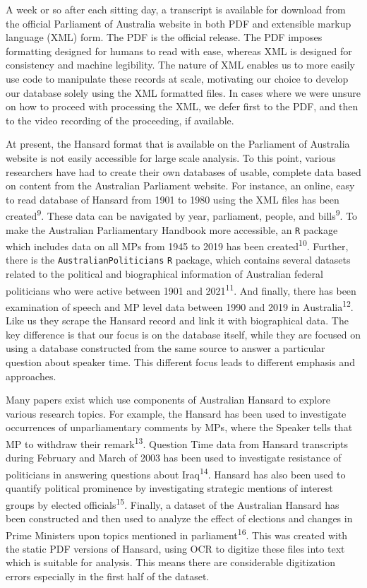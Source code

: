 \documentclass[
  letterpaper,
  DIV=11,
  numbers=noendperiod]{scrartcl}
\begin{document}
A week or so after each sitting day, a transcript is available for
download from the official Parliament of Australia website in both PDF
and extensible markup language (XML) form. The PDF is the official
release. The PDF imposes formatting designed for humans to read with
ease, whereas XML is designed for consistency and machine legibility.
The nature of XML enables us to more easily use code to manipulate these
records at scale, motivating our choice to develop our database solely
using the XML formatted files. In cases where we were unsure on how to
proceed with processing the XML, we defer first to the PDF, and then to
the video recording of the proceeding, if available.

At present, the Hansard format that is available on the Parliament of
Australia website is not easily accessible for large scale analysis. To
this point, various researchers have had to create their own databases
of usable, complete data based on content from the Australian Parliament
website. For instance, an online, easy to read database of Hansard from
1901 to 1980 using the XML files has been created\textsuperscript{9}.
These data can be navigated by year, parliament, people, and
bills\textsuperscript{9}. To make the Australian Parliamentary Handbook
more accessible, an \texttt{R} package which includes data on all MPs
from 1945 to 2019 has been created\textsuperscript{10}. Further, there
is the \texttt{AustralianPoliticians} \texttt{R} package, which contains
several datasets related to the political and biographical information
of Australian federal politicians who were active between 1901 and
2021\textsuperscript{11}. And finally, there has been examination of
speech and MP level data between 1990 and 2019 in
Australia\textsuperscript{12}. Like us they scrape the Hansard record
and link it with biographical data. The key difference is that our focus
is on the database itself, while they are focused on using a database
constructed from the same source to answer a particular question about
speaker time. This different focus leads to different emphasis and
approaches.

Many papers exist which use components of Australian Hansard to explore
various research topics. For example, the Hansard has been used to
investigate occurrences of unparliamentary comments by MPs, where the
Speaker tells that MP to withdraw their remark\textsuperscript{13}.
Question Time data from Hansard transcripts during February and March of
2003 has been used to investigate resistance of politicians in answering
questions about Iraq\textsuperscript{14}. Hansard has also been used to
quantify political prominence by investigating strategic mentions of
interest groups by elected officials\textsuperscript{15}. Finally, a
dataset of the Australian Hansard has been constructed and then used to
analyze the effect of elections and changes in Prime Ministers upon
topics mentioned in parliament\textsuperscript{16}. This was created
with the static PDF versions of Hansard, using OCR to digitize these
files into text which is suitable for analysis. This means there are
considerable digitization errors especially in the first half of the
dataset.
\end{document}
